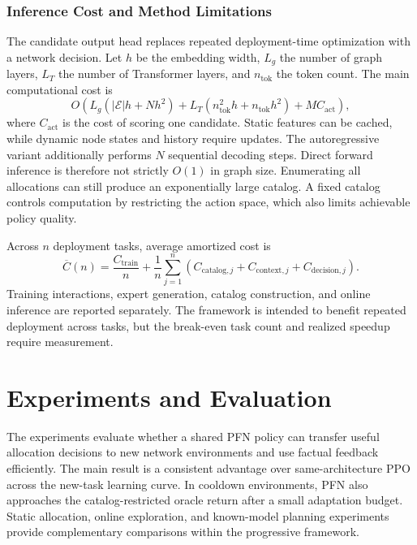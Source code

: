\documentclass[a4paper,11pt]{article}
\numberwithin{equation}{section}
\begin{document}
\subsubsection{Inference Cost and Method Limitations}
The candidate output head replaces repeated deployment-time optimization with a network decision. Let $h$ be the embedding width, $L_g$ the number of graph layers, $L_T$ the number of Transformer layers, and $n_{\mathrm{tok}}$ the token count. The main computational cost is
\begin{equation}
O\!\left(L_g(|\mathcal E|h+Nh^2)
+L_T(n_{\mathrm{tok}}^2h+n_{\mathrm{tok}}h^2)+M C_{\mathrm{act}}\right),
\label{eq:complexity}
\end{equation}
where $C_{\mathrm{act}}$ is the cost of scoring one candidate. Static features can be cached, while dynamic node states and history require updates. The autoregressive variant additionally performs $N$ sequential decoding steps. Direct forward inference is therefore not strictly $O(1)$ in graph size. Enumerating all allocations can still produce an exponentially large catalog. A fixed catalog controls computation by restricting the action space, which also limits achievable policy quality.

Across $n$ deployment tasks, average amortized cost is
\begin{equation}
\overline C(n)=\frac{C_{\mathrm{train}}}{n}
+\frac1n\sum_{j=1}^n(C_{\mathrm{catalog},j}+C_{\mathrm{context},j}+C_{\mathrm{decision},j}).
\label{eq:amortized-cost}
\end{equation}
Training interactions, expert generation, catalog construction, and online inference are reported separately. The framework is intended to benefit repeated deployment across tasks, but the break-even task count and realized speedup require measurement.

\section{Experiments and Evaluation}
\label{sec:experiments}
The experiments evaluate whether a shared PFN policy can transfer useful allocation decisions to new network environments and use factual feedback efficiently. The main result is a consistent advantage over same-architecture PPO across the new-task learning curve. In cooldown environments, PFN also approaches the catalog-restricted oracle return after a small adaptation budget. Static allocation, online exploration, and known-model planning experiments provide complementary comparisons within the progressive framework.
\end{document}
